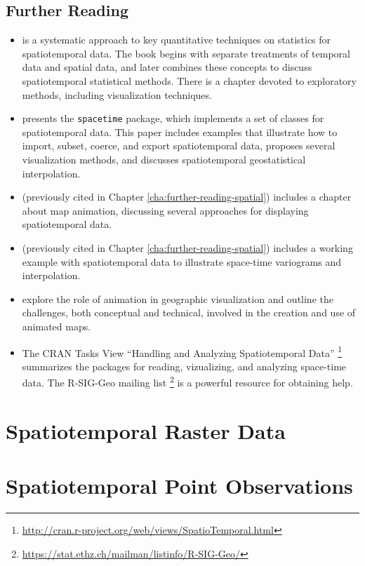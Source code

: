 \documentclass[smallroyalvopaper]{memoir}
\begin{document}
\section{Further Reading}
\label{sec:orgheadline42}
\label{cha:further-reading-spatiotime}

\begin{itemize}
\item \cite{Cressie.Wikle2011} is a systematic approach to key quantitative techniques on statistics for spatiotemporal data. The book begins with separate treatments of temporal data and spatial data, and later combines these concepts to discuss spatiotemporal statistical methods. There is a chapter devoted to exploratory methods, including visualization techniques.

\item \cite{Pebesma2012} presents the \texttt{spacetime} package, which implements a set of classes for spatiotemporal data. This paper includes examples that illustrate how to import, subset, coerce, and export spatiotemporal data, proposes several visualization methods, and discusses spatiotemporal geostatistical interpolation.

\item \cite{Slocum.McMaster.ea2005} (previously cited in Chapter \ref{cha:further-reading-spatial}) includes a chapter about map animation, discussing several approaches for displaying spatiotemporal data.

\item \cite{Hengl2009} (previously cited in Chapter \ref{cha:further-reading-spatial}) includes a working example with spatiotemporal data to illustrate space-time variograms and interpolation.

\item \cite{Harrower.Fabrikant2008} explore the role of animation in geographic visualization and outline the challenges, both conceptual and technical, involved in the creation and use of animated maps.

\item The CRAN Tasks View ``Handling and Analyzing Spatiotemporal Data'' \footnote{\url{http://cran.r-project.org/web/views/SpatioTemporal.html}} summarizes the packages for reading, vizualizing, and analyzing space-time data. The R-SIG-Geo mailing list \footnote{\url{https://stat.ethz.ch/mailman/listinfo/R-SIG-Geo/}} is a powerful resource for obtaining help.
\end{itemize}

\chapter{Spatiotemporal Raster Data}
\label{sec:orgheadline44}
\label{cha:rasterST}

\chapter{Spatiotemporal Point Observations}
\label{sec:orgheadline45}
\label{cha:pointsST}

\backmatter

\printbibliography
\end{document}
